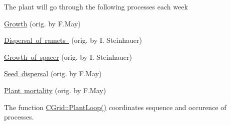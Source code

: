The plant will go through the following processes each week
\begin{DoxyItemize}
\item \mbox{\hyperlink{class_c_plant_a475e1b0149b52abca2a699f20960c552}{Growth}} (orig. by F.\+May)
\item \mbox{\hyperlink{class_c_grid_a2a233420c6bd8f36c2d6816ecba32238}{Dispersal of ramets }} (orig. by I. Steinhauer)
\item \mbox{\hyperlink{class_c_plant_abc8381f34cb7dd169a60d886ced465be}{Growth of spacer}} (orig. by I. Steinhauer)
\item \mbox{\hyperlink{class_c_grid_aa95eae161d68dea277b7683d9d0fef0d}{Seed dispersal}} (orig. by F.\+May)
\item \mbox{\hyperlink{class_c_plant_a79fb5e9ec6b21eb939a25252c8cca2e2}{Plant mortality}} (orig. by F.\+May)
\end{DoxyItemize}

The function \mbox{\hyperlink{class_c_grid_ad1258e316e92fd63a0efa7f594cefbf3}{C\+Grid\+::\+Plant\+Loop()}} coordinates sequence and occurence of processes. 